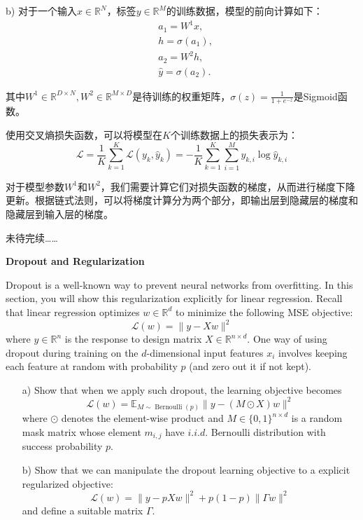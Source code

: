 \documentclass{homework}
\begin{document}
b) 对于一个输入$x \in \mathbb{R}^N$，标签$y \in \mathbb{R}^M$的训练数据，模型的前向计算如下：
$$\begin{aligned}
    & a_{1}=W^{1} x, \\
    & h=\sigma\left(a_{1}\right), \\
    & a_{2}=W^{2} h, \\
    & \hat{y}=\sigma\left(a_{2}\right) .
\end{aligned}$$ 

其中$W^{1} \in \mathbb{R}^{D \times N}, W^{2} \in \mathbb{R}^{M \times D}$是待训练的权重矩阵，$\sigma(z)=\frac{1}{1+e^{-z}}$是Sigmoid函数。

使用交叉熵损失函数，可以将模型在$K$个训练数据上的损失表示为：
$$\mathcal{L}=\frac{1}{K} \sum_{k=1}^{K} \mathcal{L}\left(y_{k}, \hat{y}_{k}\right)=-\frac{1}{K} \sum_{k=1}^{K} \sum_{i=1}^{M} y_{k,i} \log \hat{y}_{k,i}$$

对于模型参数$W^{1}$和$W^{2}$，我们需要计算它们对损失函数的梯度，从而进行梯度下降更新。根据链式法则，可以将梯度计算分为两个部分，即输出层到隐藏层的梯度和隐藏层到输入层的梯度。

未待完续……

\newpage
\begin{shaded}
    \question \textbf{Dropout and Regularization}
    
    Dropout is a well-known way to prevent neural networks from overfitting. In this section, you will show this regularization explicitly for linear regression. Recall that linear regression optimizes $w \in \mathbb{R}^{d}$ to minimize the following MSE objective:
    $$
    \mathcal{L}(w)=\|y-X w\|^{2}
    $$
    where $y \in \mathbb{R}^{n}$ is the response to design matrix $X \in \mathbb{R}^{n \times d}$. One way of using dropout during training on the $d$-dimensional input features $x_{i}$ involves keeping each feature at random with probability $p$ (and zero out it if not kept).
    \begin{enumerate}
        \item[a)] Show that when we apply such dropout, the learning objective becomes
        $$
        \mathcal{L}(w)=\mathbb{E}_{M \sim \operatorname{Bernoulli}(p)}\|y-(M \odot X) w\|^{2}
        $$
        where $\odot$ denotes the element-wise product and $M \in\{0,1\}^{n \times d}$ is a random mask matrix whose element $m_{i, j}$ have $i . i . d$. Bernoulli distribution with success probability $p$.
        \item[b)] Show that we can manipulate the dropout learning objective to a explicit regularized objective:
        $$
        \mathcal{L}(w)=\|y-p X w\|^{2}+p(1-p)\|\Gamma w\|^{2}
        $$
        and define a suitable matrix $\Gamma$.
    \end{enumerate}
\end{shaded}
\end{document}
